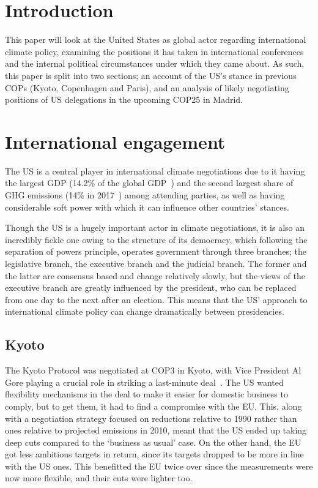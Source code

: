 \section{Introduction}

This paper will look at the United States as global actor regarding
international climate policy, examining the positions it has taken in
international conferences and the internal political circumstances
under which they came about. As such, this paper is split into two
sections; an account of the US’s stance in previous COPs (Kyoto,
Copenhagen and Paris), and an analysis of likely negotiating positions
of US delegations in the upcoming COP25 in Madrid.

\section{International engagement}

The US is a central player in international climate negotiations due to it
having the largest GDP (14.2\% of the global GDP~\cite{countryGdp}) and the second
largest share of GHG emissions (14\% in 2017~\cite{muntean2018fossil}) among attending parties, as well as having
considerable soft power with which it can influence other countries' stances.

Though the US is a hugely important actor in climate negotiations, it
is also an incredibly fickle one owing to the structure of its
democracy, which following the separation of powers principle,
operates government through three branches; the legislative branch,
the executive branch and the judicial branch. The former and the
latter are consensus based and change relatively slowly, but the views
of the executive branch are greatly influenced by the president, who
can be replaced from one day to the next after an election. This means
that the US’ approach to international climate policy can change
dramatically between presidencies.

\subsection{Kyoto}

The Kyoto Protocol was negotiated at COP3 in Kyoto, with Vice President Al Gore playing a crucial role in
striking a last-minute deal~\cite{harrison2010united}. The US wanted flexibility
mechanisms in the deal to make it easier for domestic business to comply, but to get them, it had to find a compromise with the EU. This, along with a negotiation strategy focused on reductions relative to 1990 rather than ones relative to projected emissions in 2010, meant that the US ended up taking deep cuts compared to the `business as usual' case.
On the other hand, the EU got less ambitious targets in return, since its targets dropped to be
more in line with the US ones. This benefitted the EU twice over since
the measurements were now more flexible, and their cuts were lighter too.

